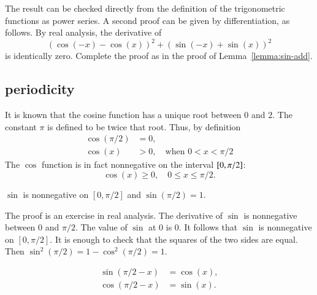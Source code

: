 \begin{proved}
The result can be checked directly from the definition of the trigonometric functions
as power series.  A second proof can be given by differentiation, as follows.
By real analysis, the derivative of
\[ 
(\cos(-x) - \cos(x))^2 + (\sin(-x)
  +\sin(x))^2
\] 
is identically zero.  Complete the proof as in the proof of
Lemma~\ref{lemma:sin-add}.  \swallowed\end{proved}

\subsection{periodicity}
\label{sec:pi}
%

It is known that the cosine function has a unique root between $0$
and $2$. The constant $\pi$ is defined to be twice that root.  Thus, by
definition 
\begin{align}\label{eqn:cospi2}
\cos(\pi/2) &= 0,\nonumber\\
\cos(x) &>0,\quad \text{when } 0<x<\pi/2
\end{align}
The $\cos$ function is in fact
nonnegative on the interval $[ 0,\pi/2]$:
\begin{equation}\label{eqn:cospos}
\cos(x)\ge 0,   \quad 0\le x \le \pi/2.
\end{equation}
%

\begin{lemma}[]\label{lemma:sin-pi2}
$\sin$ is nonnegative on $[0,\pi/2]$ and  $\sin (\pi/2) = 1.$
\end{lemma}

\begin{proved}
  The proof is an exercise in real analysis.
  The derivative of $\sin$ is
  nonnegative between $0$ and $\pi/2$.  The
  value of $\sin$ at $0$ is $0$.  It follows that
  $\sin$ is nonnegative on $[0,\pi/2]$.  It is enough to check that
  the squares of the two sides are equal.  Then $\sin^2(\pi/2)
  = {1-\cos^2(\pi/2)}
  = 1$.  \swallowed\end{proved}

\begin{lemma}[]\label{lemma:cos-sin}
\begin{align*}
\sin(\pi/2 - x)&=\cos(x),\\
\cos(\pi/2 - x)&=\sin(x).
\end{align*}
\end{lemma}

